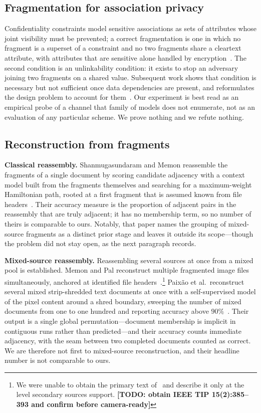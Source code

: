 \documentclass[sigconf,nonacm]{acmart}
\newcommand{\TODO}[1]{\textbf{[TODO: #1]}}
\begin{document}
\subsection{Fragmentation for association privacy}
Confidentiality constraints model sensitive associations as sets of attributes
whose joint visibility must be prevented; a correct fragmentation is one in which
no fragment is a superset of a constraint and no two fragments share a cleartext
attribute, with attributes that are sensitive alone handled by
encryption~\cite{ciriani2010}. The second condition is an unlinkability
condition: it exists to stop an adversary joining two fragments on a shared
value. Subsequent work shows that condition is necessary but not sufficient once
data dependencies are present, and reformulates the design problem to account for
them~\cite{decapitani2014}. Our experiment is best read as an empirical probe of
a channel that family of models does not enumerate, not as an evaluation of any
particular scheme. We prove nothing and we refute nothing.

\subsection{Reconstruction from fragments}
\textbf{Classical reassembly.} Shanmugasundaram and Memon reassemble the
fragments of a single document by scoring candidate adjacency with a
context model built from the fragments themselves and searching for a
maximum-weight Hamiltonian path, rooted at a first fragment that is assumed known
from file headers~\cite{shanmugasundaram2003}. Their accuracy measure is the
proportion of adjacent pairs in the reassembly that are truly adjacent; it has no
membership term, so no number of theirs is comparable to ours. Notably, that
paper names the grouping of mixed-source fragments as a distinct prior stage and
leaves it outside its scope---though the problem did not stay open, as the next
paragraph records.

\textbf{Mixed-source reassembly.} Reassembling several sources at once from a
mixed pool is established. Memon and Pal reconstruct multiple fragmented image
files simultaneously, anchored at identified file
headers~\cite{memonpal2006}.\footnote{We were unable to obtain the primary text
of~\cite{memonpal2006} and describe it only at the level secondary sources
support. \TODO{obtain IEEE TIP 15(2):385--393 and confirm before camera-ready}}
Paixão et al.\ reconstruct several mixed strip-shredded text documents at once
with a self-supervised model of the pixel content around a shred boundary,
sweeping the number of mixed documents from one to one hundred and reporting
accuracy above $90\%$~\cite{paixao2020}. Their output is a single global
permutation---document membership is implicit in contiguous runs rather than
predicted---and their accuracy counts immediate adjacency, with the seam between
two completed documents counted as correct. We are therefore not first to
mixed-source reconstruction, and their headline number is not comparable to ours.
\end{document}
